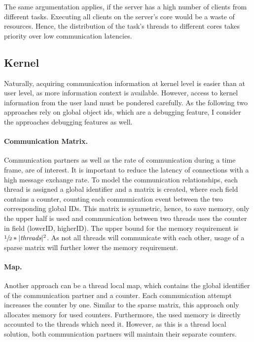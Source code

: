 The same argumentation applies, if the server has a high number of clients from
different tasks.
Executing all clients on the server's core would be a waste of resources.
Hence, the distribution of the task's threads to different cores takes priority
over low communication latencies.


\subsection{Kernel}
Naturally, acquiring communication information at kernel level is easier than
at user level, as more information context is available.
However, access to kernel information from the user land must be pondered carefully.
As the following two approaches rely on global object ids, which are a debugging
feature, I consider the approaches debugging features as well.


\paragraph{Communication Matrix.}
Communication partners as well as the rate of communication during a time
frame, are of interest.
It is important to reduce the latency of connections with a high message
exchange rate.
To model the communication relationships, each thread is assigned a global
identifier and a matrix is created, where each field contains a counter,
counting each communication event between the two corresponding global IDs.
This matrix is symmetric, hence, to save memory, only the upper half is used
and communication between two threads uses the counter in field
(lowerID, higherID).
The upper bound for the memory requirement is $\sfrac{1}{2} * |\textit{threads}|^2$.
As not all threads will communicate with each other, usage of a sparse matrix
will further lower the memory requirement.

\paragraph{Map.}
Another approach can be a thread local map, which contains the global
identifier of the communication partner and a counter.
Each communication attempt increases the counter by one.
Similar to the sparse matrix, this approach only allocates memory for used
counters.
Furthermore, the used memory is directly accounted to the threads which need it.
However, as this is a thread local solution, both communication partners will
maintain their separate counters.

